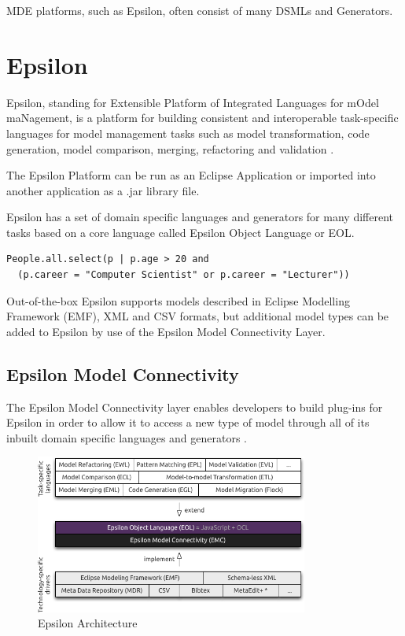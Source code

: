 \documentclass[11pt]{book}
\begin{document}
MDE platforms, such as Epsilon, often consist of many DSMLs and Generators.

\section{Epsilon}
Epsilon, standing for Extensible Platform of Integrated Languages for mOdel maNagement, is a platform for building consistent and interoperable task-specific languages for model management tasks such as model transformation, code generation, model comparison, merging, refactoring and validation \cite{theepsilonbook}. 

The Epsilon Platform can be run as an Eclipse Application or imported into another application as a .jar library file.

Epsilon has a set of domain specific languages and generators for many different tasks based on a core language called Epsilon Object Language or EOL. 

\begin{lstlisting}[caption=An example of EOL code, label=lst:exampleEolCode]
People.all.select(p | p.age > 20 and 
  (p.career = "Computer Scientist" or p.career = "Lecturer"))
\end{lstlisting}

Out-of-the-box Epsilon supports models described in Eclipse Modelling Framework (EMF), XML and CSV formats, but additional model types can be added to Epsilon by use of the Epsilon Model Connectivity Layer.

\subsection{Epsilon Model Connectivity}
The Epsilon Model Connectivity layer enables developers to build plug-ins for Epsilon in order to allow it to access a new type of model through all of its inbuilt domain specific languages and generators \cite{theepsilonbook}.

\begin{figure}[h]
	\centering
	\includegraphics[width=0.8\textwidth]{images/epsilon-architecture}
	\caption{Epsilon Architecture \cite{emcdocs}}
	\label{fig:emc}
\end{figure}
\end{document}
